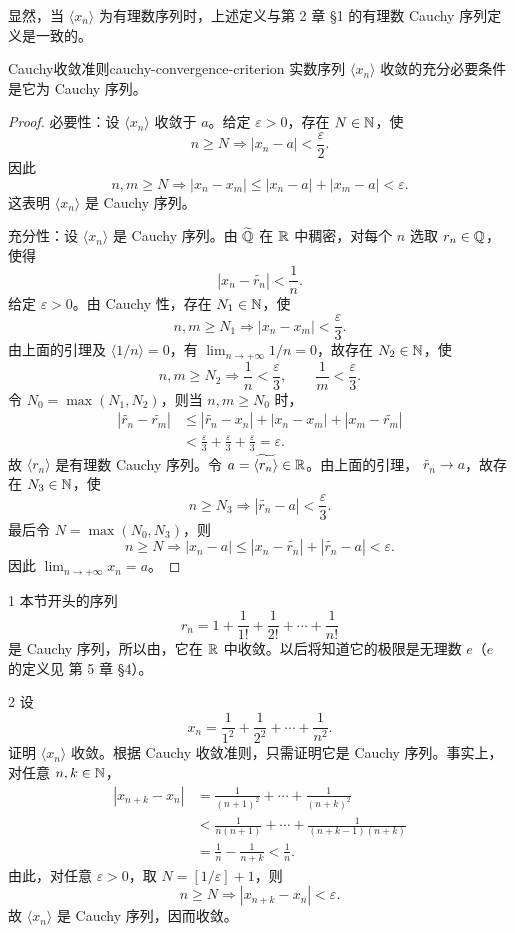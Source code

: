 显然，当 \(\langle x_n\rangle\) 为有理数序列时，上述定义与第 2 章
\S 1 的有理数 Cauchy 序列定义是一致的。

\begin{mythm}{Cauchy收敛准则}{cauchy-convergence-criterion}
实数序列 \(\langle x_n\rangle\) 收敛的充分必要条件是它为 Cauchy
序列。
\end{mythm}

\begin{proof}
必要性：设 \(\langle x_n\rangle\) 收敛于 \(a\)。给定
\(\varepsilon>0\)，存在 \(N\in\mathbb{N}\)，使
\[
n\geqslant N\Longrightarrow |x_n-a|<\frac\varepsilon2.
\]
因此
\[
n,m\geqslant N\Longrightarrow
|x_n-x_m|\leqslant|x_n-a|+|x_m-a|<\varepsilon.
\]
这表明 \(\langle x_n\rangle\) 是 Cauchy 序列。

充分性：设 \(\langle x_n\rangle\) 是 Cauchy 序列。由
\(\widetilde{\mathbb{Q}}\) 在 \(\mathbb{R}\) 中稠密，对每个 \(n\) 选取 \(r_n\in\mathbb{Q}\)，
使得
\[
|x_n-\widetilde{r_n}|<\frac1n.
\]
给定 \(\varepsilon>0\)。由 Cauchy 性，存在 \(N_1\in\mathbb{N}\)，使
\[
n,m\geqslant N_1\Longrightarrow |x_n-x_m|<\frac\varepsilon3.
\]
由上面的引理及 \(\langle 1/n\rangle=0\)，有
\(\lim_{n\to+\infty}1/n=0\)，故存在 \(N_2\in\mathbb{N}\)，使
\[
n,m\geqslant N_2\Longrightarrow
\frac1n<\frac\varepsilon3,\qquad \frac1m<\frac\varepsilon3.
\]
令 \(N_0=\max(N_1,N_2)\)，则当 \(n,m\geqslant N_0\) 时，
\[
\begin{aligned}
|\widetilde{r_n}-\widetilde{r_m}|
&\leqslant|\widetilde{r_n}-x_n|+|x_n-x_m|
       +|x_m-\widetilde{r_m}|\\
&<\frac\varepsilon3+\frac\varepsilon3+\frac\varepsilon3
=\varepsilon.
\end{aligned}
\]
故 \(\langle r_n\rangle\) 是有理数 Cauchy 序列。令
\(a=\widetilde{\langle r_n\rangle}\in\mathbb{R}\)。由上面的引理，
\(\widetilde{r_n}\to a\)，故存在 \(N_3\in\mathbb{N}\)，使
\[
n\geqslant N_3\Longrightarrow
|\widetilde{r_n}-a|<\frac\varepsilon3.
\]
最后令 \(N=\max(N_0,N_3)\)，则
\[
n\geqslant N\Longrightarrow
|x_n-a|\leqslant|x_n-\widetilde{r_n}|+|\widetilde{r_n}-a|
<\varepsilon.
\]
因此 \(\lim_{n\to+\infty}x_n=a\)。
\end{proof}

\begin{sourceexample}{1}
本节开头的序列
\[
r_n=1+\frac1{1!}+\frac1{2!}+\cdots+\frac1{n!}
\]
是 Cauchy 序列，所以由，它在
\(\mathbb{R}\) 中收敛。以后将知道它的极限是无理数 \(e\)（\(e\) 的定义见
第 5 章 \S 4）。
\end{sourceexample}

\begin{sourceexample}{2}
设
\[
x_n=\frac1{1^2}+\frac1{2^2}+\cdots+\frac1{n^2}.
\]
证明 \(\langle x_n\rangle\) 收敛。根据 Cauchy 收敛准则，只需证明它是
Cauchy 序列。事实上，对任意 \(n,k\in\mathbb{N}\)，
\[
\begin{aligned}
|x_{n+k}-x_n|
&=\frac1{(n+1)^2}+\cdots+\frac1{(n+k)^2}\\
&<\frac1{n(n+1)}+\cdots+\frac1{(n+k-1)(n+k)}\\
&=\frac1n-\frac1{n+k}<\frac1n.
\end{aligned}
\]
由此，对任意 \(\varepsilon>0\)，取 \(N=[1/\varepsilon]+1\)，则
\[
n\geqslant N\Longrightarrow |x_{n+k}-x_n|<\varepsilon.
\]
故 \(\langle x_n\rangle\) 是 Cauchy 序列，因而收敛。
\end{sourceexample}

